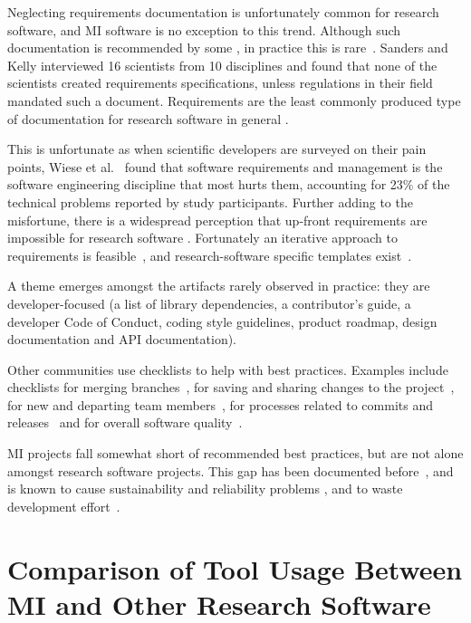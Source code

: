 \documentclass[doubleblind,12pt, 3p, times]{elsarticle}
\begin{document}
Neglecting requirements documentation is unfortunately common for research
software, and MI software is no exception to this trend.  Although such
documentation is recommended by some \cite{TobiasEtAl2018, HerouxEtAl2008,
SmithAndKoothoor2016}, in practice this is rare~\cite{HeatonAndCarver2015}.
Sanders and Kelly \cite{SandersAndKelly2008} interviewed 16 scientists from 10
disciplines and found that none of the scientists created requirements
specifications, unless regulations in their field mandated such a document.
Requirements are the least commonly produced type of documentation for research
software in general \cite{Nguyen-HoanEtAl2010}. 

This is unfortunate as when scientific developers are surveyed on their pain
points, Wiese et al.~\cite{WieseEtAl2019} found that software requirements and
management is the software engineering discipline that most hurts them,
accounting for 23\% of the technical problems reported by study participants.
Further adding to the misfortune, there is a widespread perception that up-front
requirements are impossible for research software \cite{CarverEtAl2007,
SegalAndMorris2008}. Fortunately an iterative approach to requirements is
feasible~\cite{Smith2016}, and research-software specific templates
exist~\cite{SmithEtAl2007}. 

A theme emerges amongst the artifacts rarely observed in practice: they
are developer-focused (a list of library dependencies, a contributor's guide,
a developer Code of Conduct, coding style guidelines, product roadmap, design
documentation and API documentation).

Other communities use checklists to help with best practices. Examples include
checklists for merging branches~\cite{Brown2015}, for saving and sharing changes
to the project~\cite{WilsonEtAl2016}, for new and departing team
members~\cite{HerouxAndBernholdt2018}, for processes related to commits and
releases~\cite{HerouxEtAl2008} and for overall software
quality~\cite{ThielEtAl2020, SSI2022}.

MI projects fall somewhat short of recommended best practices, but are not alone
amongst research software projects. This gap has been documented
before~\cite{Storer2017,JohansonAndHasselbring2018}, and is known to cause
sustainability and reliability problems \cite{FaulkEtAl2009}, and to waste
development effort~\cite{deSouzaEtAl2019}.

\section{Comparison of Tool Usage Between MI and Other Research Software}
\label{Sec_CompareTools}
\end{document}
